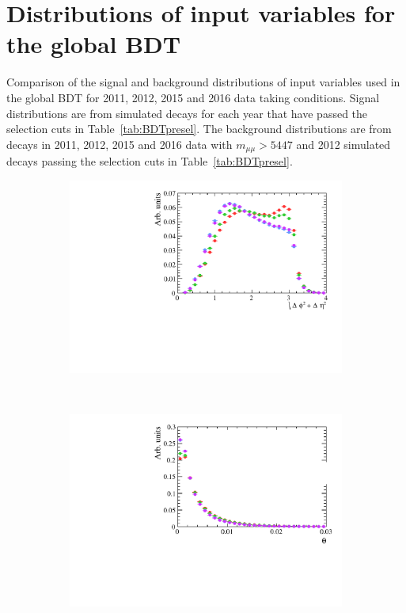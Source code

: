 \chapter{Distributions of input variables for the global BDT}
\label{sec:appendix1}
Comparison of the signal and background distributions of input variables used in the global BDT for 2011, 2012, 2015 and 2016 data taking conditions. Signal distributions are from simulated \bsmumu decays for each year that have passed the selection cuts in Table~\ref{tab:BDTpresel}. The background distributions are from \bbbarmumux decays in 2011, 2012, 2015 and 2016 data with $m_{\mu \mu} > 5447$ \mevcc and 2012 simulated \bbbarmumux decays passing the selection cuts in Table~\ref{tab:BDTpresel}.
\begin{figure}
    \centering
    \begin{subfigure}[b]{0.48\textwidth}
        \includegraphics[width=\textwidth]{./Figs/Selection/signal_deltaR.pdf}
    \end{subfigure}
    ~ %
    \begin{subfigure}[b]{0.48\textwidth}
       \includegraphics[width=\textwidth]{./Figs/Selection/signal_DIRA.pdf}
    \end{subfigure}




\end{figure}
